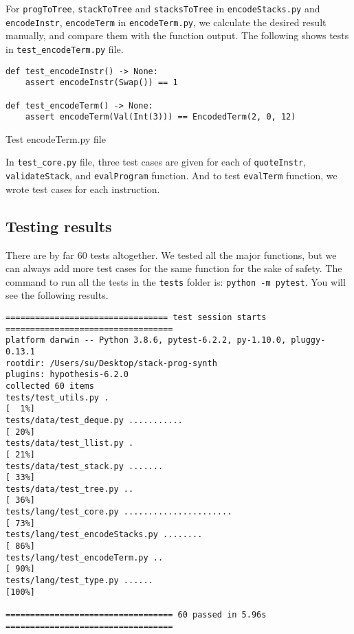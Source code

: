 For \texttt{progToTree}, \texttt{stackToTree} and \texttt{stacksToTree} in \texttt{encodeStacks.py} and \texttt{encodeInstr}, \texttt{encodeTerm} in \texttt{encodeTerm.py}, we calculate the desired result manually, and compare them with the function output. The following shows tests in \texttt{test\_encodeTerm.py} file.
\begin{listing}[H]
\begin{verbatim}
def test_encodeInstr() -> None:
    assert encodeInstr(Swap()) == 1

def test_encodeTerm() -> None:
    assert encodeTerm(Val(Int(3))) == EncodedTerm(2, 0, 12)
\end{verbatim}
\caption{Test encodeTerm.py file}
\end{listing}

In \texttt{test\_core.py} file, three test cases are given for each of \texttt{quoteInstr}, \texttt{validateStack}, and \texttt{evalProgram} function. And to test \texttt{evalTerm} function, we wrote test cases for each instruction.

\subsection{Testing results}
There are by far 60 tests altogether. We tested all the major functions, but we can always add more test cases for the same function for the sake of safety. The command to run all the tests in the \texttt{tests} folder is: \texttt{python -m pytest}. You will see the following results.
{\small
\begin{verbatim}
================================= test session starts ==================================
platform darwin -- Python 3.8.6, pytest-6.2.2, py-1.10.0, pluggy-0.13.1
rootdir: /Users/su/Desktop/stack-prog-synth
plugins: hypothesis-6.2.0
collected 60 items                                                                         
tests/test_utils.py .                                                           [  1%]
tests/data/test_deque.py ...........                                            [ 20%]
tests/data/test_llist.py .                                                      [ 21%]
tests/data/test_stack.py .......                                                [ 33%]
tests/data/test_tree.py ..                                                      [ 36%]
tests/lang/test_core.py ......................                                  [ 73%]
tests/lang/test_encodeStacks.py ........                                        [ 86%]
tests/lang/test_encodeTerm.py ..                                                [ 90%]
tests/lang/test_type.py ......                                                  [100%]

================================== 60 passed in 5.96s ==================================
\end{verbatim}
}